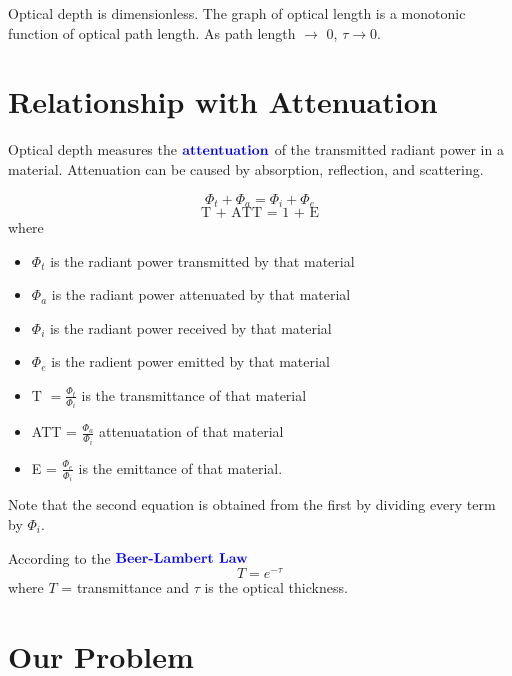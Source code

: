 \documentclass[12pt]{scrartcl}
\begin{document}
\begin{note}
    Optical depth is dimensionless. The graph of optical length is a monotonic  function of optical path length. As path length $\to$ 0, $\tau \to 0$.
\end{note}

\section{Relationship with Attenuation}

\begin{definition}
    Optical depth measures the $\textbf{\color{blue} attentuation}$ of the transmitted radiant power in a material. Attenuation can be caused by absorption, reflection, and scattering.
\end{definition}

\begin{lemma}
    \[\Phi_t + \Phi_a = \Phi_i + \Phi_e\]
    \[\text{T + ATT = 1 + E}\]
    where
    \begin{itemize}
        \item $\Phi_t$ is the radiant power transmitted by that material
        \item $\Phi_a$ is the radiant power attenuated by that material
        \item $\Phi_i$ is the radiant power received by that material
        \item $\Phi_e$ is the radient power emitted by that material
        \item T $= \frac{\Phi_t}{\Phi_i}$ is the transmittance of that material
        \item ATT = $\frac{\Phi_a}{\Phi_i}$ attenuatation of that material
        \item E = $\frac{\Phi_e}{\Phi_i}$ is the emittance of that material.
    \end{itemize}
    Note that the second equation is obtained from the first by dividing every term by $\Phi_i$.
\end{lemma}

\begin{definition}
    According to the $\textbf{\color{blue} Beer-Lambert Law}$
    \[T = e^{-\tau}\]
    where $T$ = transmittance and $\tau$ is the optical thickness.
\end{definition}

\section{Our Problem}
\end{document}
